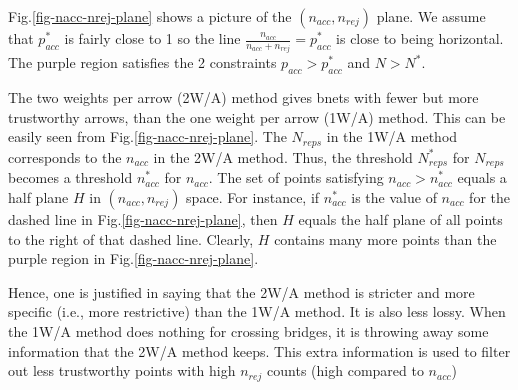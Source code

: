 \documentclass[12pt]{article}
\begin{document}
Fig.\ref{fig-nacc-nrej-plane}
shows a picture of the $(n_{acc}, n_{rej})$
plane. We assume that $p_{acc}^*$ is fairly
close to 1 so the
line $\frac{n_{acc}}{n_{acc}+ n_{rej}} = p^*_{acc}$
is close to being horizontal.
The purple region satisfies the 
2 constraints $p_{acc} > p_{acc}^*$ and $N> N^*$.

The two weights per arrow (2W/A) method
gives bnets with fewer  but more trustworthy
arrows, than the one weight per arrow (1W/A) method. 
This can be easily seen from Fig.\ref{fig-nacc-nrej-plane}.
The $N_{reps}$ in the 1W/A method corresponds to
the $n_{acc}$ in the 2W/A method.
Thus, the threshold $N^*_{reps}$ for $N_{reps}$
becomes a threshold $n^*_{acc}$ for $n_{acc}$.
The set of points satisfying $n_{acc} > n^*_{acc} $
equals a half plane $H$ in $(n_{acc}, n_{rej})$ space. For instance, if $n_{acc}^*$
is the value of $n_{acc}$
for the dashed line 
in Fig.\ref{fig-nacc-nrej-plane},
then $H$ equals the half plane of all points to the right of that
dashed line.
Clearly, $H$
contains many more 
points than the purple region
in Fig.\ref{fig-nacc-nrej-plane}.

Hence, one is justified in saying that the 2W/A method
is stricter and more specific (i.e., more restrictive) than the
1W/A method. It is also
less lossy. When the 1W/A method does nothing 
for crossing bridges, it is
throwing away some information
that the 2W/A method keeps. This extra information
is used to filter out less trustworthy points with
high $n_{rej}$ counts (high compared to $n_{acc}$)









\end{document}
